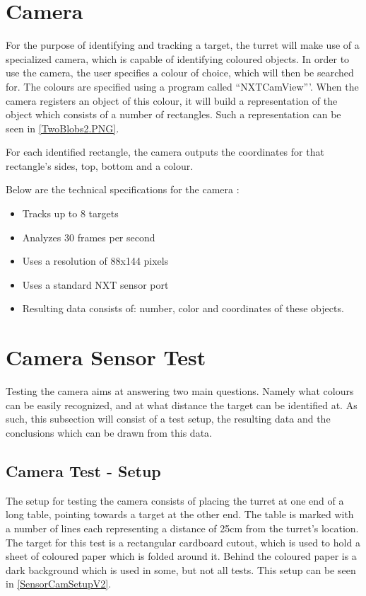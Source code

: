 \section{Camera}\label{SensorTheory}
For the purpose of identifying and tracking a target, the turret will
make use of a specialized camera, which is capable of identifying coloured
objects. In order to use the camera, the user specifies a colour of choice,
which will then be searched for. The colours are specified using a program
called ``NXTCamView'''. When the camera registers an object of this colour, it will
build a representation of the object which consists of a number of
rectangles. Such a representation can be seen in \autoref{TwoBlobs2.PNG}.


For each identified rectangle, the camera outputs the coordinates for that
rectangle's sides, top, bottom and a colour. 

Below are the technical specifications for the camera \citep[p. 1]{NXTCam}:
\begin{itemize}
  \item Tracks up to 8 targets
  \item Analyzes 30 frames per second
  \item Uses a resolution of 88x144 pixels
  \item Uses a standard NXT sensor port
  \item Resulting data consists of: number, color and coordinates of these
  objects.
\end{itemize}

\section{Camera Sensor Test}\label{CamTest}%
Testing the camera aims at answering two main questions. Namely
what colours can be easily recognized, and at what distance the target can be
identified at. As such, this subsection will consist of a test setup, the
resulting data and the conclusions which can be drawn from this data.

\subsection{Camera Test - Setup}\label{CamTestSetup}
The setup for testing the camera consists of placing the turret at one end of a
long table, pointing towards a target at the other end. The table is marked with
a number of lines each representing a distance of 25cm from the turret's
location. The target for this test is a rectangular cardboard cutout, which is
used to hold a sheet of coloured paper which is folded around it. Behind the
coloured paper is a dark background which is used in some, but not all
tests.
This setup can be seen in \autoref{SensorCamSetupV2}.

